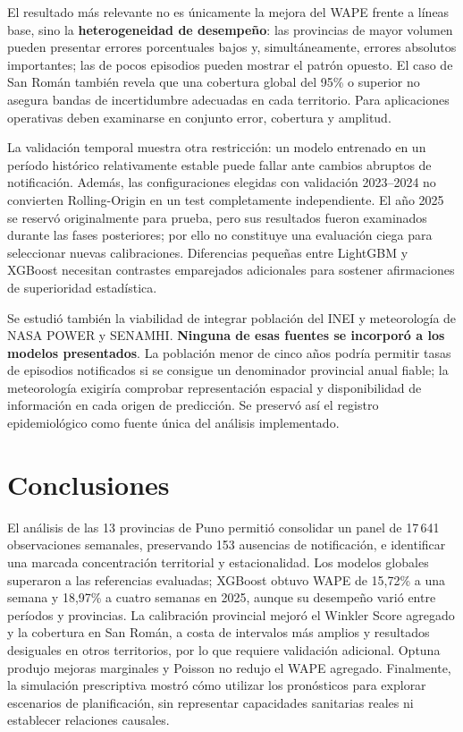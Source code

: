 \documentclass[10pt,a4paper]{article}
\begin{document}
El resultado más relevante no es únicamente la mejora del WAPE frente a líneas base, sino la \textbf{heterogeneidad de desempeño}: las provincias de mayor volumen pueden presentar errores porcentuales bajos y, simultáneamente, errores absolutos importantes; las de pocos episodios pueden mostrar el patrón opuesto. El caso de San Román también revela que una cobertura global del 95\% o superior no asegura bandas de incertidumbre adecuadas en cada territorio. Para aplicaciones operativas deben examinarse en conjunto error, cobertura y amplitud.

La validación temporal muestra otra restricción: un modelo entrenado en un período histórico relativamente estable puede fallar ante cambios abruptos de notificación. Además, las configuraciones elegidas con validación 2023--2024 no convierten Rolling-Origin en un test completamente independiente. El año 2025 se reservó originalmente para prueba, pero sus resultados fueron examinados durante las fases posteriores; por ello no constituye una evaluación ciega para seleccionar nuevas calibraciones. Diferencias pequeñas entre LightGBM y XGBoost necesitan contrastes emparejados adicionales para sostener afirmaciones de superioridad estadística.

Se estudió también la viabilidad de integrar población del INEI y meteorología de NASA POWER y SENAMHI. \textbf{Ninguna de esas fuentes se incorporó a los modelos presentados}. La población menor de cinco años podría permitir tasas de episodios notificados si se consigue un denominador provincial anual fiable; la meteorología exigiría comprobar representación espacial y disponibilidad de información en cada origen de predicción. Se preservó así el registro epidemiológico como fuente única del análisis implementado.

\section{Conclusiones}

El análisis de las 13 provincias de Puno permitió consolidar un panel de 17\,641 observaciones semanales, preservando 153 ausencias de notificación, e identificar una marcada concentración territorial y estacionalidad. Los modelos globales superaron a las referencias evaluadas; XGBoost obtuvo WAPE de 15,72\% a una semana y 18,97\% a cuatro semanas en 2025, aunque su desempeño varió entre períodos y provincias. La calibración provincial mejoró el Winkler Score agregado y la cobertura en San Román, a costa de intervalos más amplios y resultados desiguales en otros territorios, por lo que requiere validación adicional. Optuna produjo mejoras marginales y Poisson no redujo el WAPE agregado. Finalmente, la simulación prescriptiva mostró cómo utilizar los pronósticos para explorar escenarios de planificación, sin representar capacidades sanitarias reales ni establecer relaciones causales.
\end{document}
